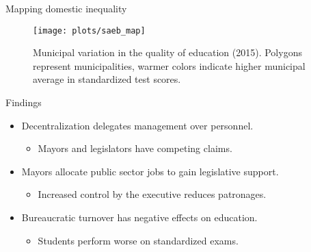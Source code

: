 \documentclass[ignorenonframetext,]{beamer}
\providecommand{\tightlist}{%
  \setlength{\itemsep}{0pt}\setlength{\parskip}{0pt}}
\begin{document}
\begin{frame}{Mapping domestic inequality}
\protect\hypertarget{mapping-domestic-inequality}{}

\begin{figure}

{\centering \texttt{[image: plots/saeb\_map]} 

}

\caption{Municipal variation in the quality of education (2015). Polygons represent municipalities, warmer colors indicate higher municipal average in standardized test scores.}\label{fig:unnamed-chunk-3}
\end{figure}

\end{frame}

\begin{frame}{Findings}
\protect\hypertarget{findings}{}

\begin{itemize}
\tightlist
\item
  Decentralization delegates management over personnel.

  \begin{itemize}
  \tightlist
  \item
    Mayors and legislators have competing claims.
  \end{itemize}
\item
  Mayors allocate public sector jobs to gain legislative support.

  \begin{itemize}
  \tightlist
  \item
    Increased control by the executive reduces patronages.
  \end{itemize}
\item
  Bureaucratic turnover has negative effects on education.

  \begin{itemize}
  \tightlist
  \item
    Students perform worse on standardized exams.
  \end{itemize}
\end{itemize}

\end{frame}
\end{document}
